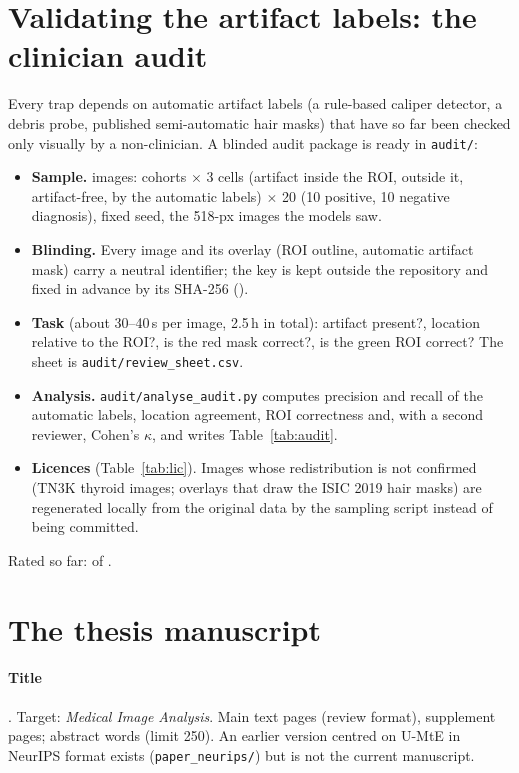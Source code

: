 \section{Validating the artifact labels: the clinician audit}
Every trap depends on automatic artifact labels (a rule-based caliper detector, a debris probe, published semi-automatic
hair masks) that have so far been checked only visually by a non-clinician. A blinded audit package is ready in
\texttt{audit/}:
\begin{itemize}[leftmargin=*]\itemsep1pt
\item \textbf{Sample.} \sSixAuditN{} images: \sSixAuditCohorts{} cohorts $\times$ 3 cells (artifact inside the ROI,
outside it, artifact-free, by the automatic labels) $\times$ 20 (10 positive, 10 negative diagnosis), fixed seed, the
518-px images the models saw.
\item \textbf{Blinding.} Every image and its overlay (ROI outline, automatic artifact mask) carry a neutral identifier;
the key is kept outside the repository and fixed in advance by its SHA-256 (\sSixAuditHash).
\item \textbf{Task} (about 30--40\,s per image, 2.5\,h in total): artifact present?, location relative to the ROI?, is the
red mask correct?, is the green ROI correct? The sheet is \texttt{audit/review\_sheet.csv}.
\item \textbf{Analysis.} \texttt{audit/analyse\_audit.py} computes precision and recall of the automatic labels, location
agreement, ROI correctness and, with a second reviewer, Cohen's $\kappa$, and writes Table~\ref{tab:audit}.
\item \textbf{Licences} (Table~\ref{tab:lic}). Images whose redistribution is not confirmed (TN3K thyroid images; overlays
that draw the ISIC 2019 hair masks) are regenerated locally from the original data by the sampling script instead of
being committed.
\end{itemize}
Rated so far: \sSixAuditRated{} of \sSixAuditN.



\section{The thesis manuscript}
\paragraph{Title} \emph{\sSixTitle}. Target: \emph{Medical Image Analysis}. Main text \sSixPagesMain{} pages (review
format), supplement \sSixPagesSupplement{} pages; abstract \sSixAbstractWords{} words (limit 250). An earlier version
centred on U-MtE in NeurIPS format exists (\texttt{paper\_neurips/}) but is not the current manuscript.
